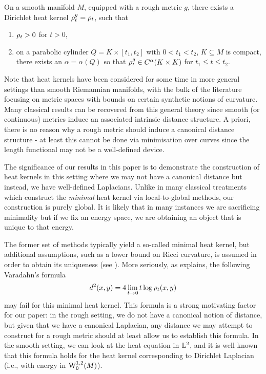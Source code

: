 \documentclass[a4paper, 12pt]{amsart}
\begin{document}
\begin{thm}
On a smooth manifold \(M\), equipped with a rough metric \(g\), there exists a 
Dirichlet heat kernel \(\hk_t^g = \hk_t\), such that
\begin{enumerate}
\item \(\hk_t > 0\) for \(t > 0\),
\item on a parabolic cylinder \(Q = K \times [t_1, t_2]\) with \(0 < t_1 < t_2\), \(K \subseteq M\) is compact, there exists an \(\alpha = \alpha(Q)\) so that \(\hk_t^g \in C^{\alpha}(K \times K)\) for \(t_1 \leq t \leq t_2\).
\end{enumerate}
\end{thm}


Note that heat kernels have been considered
for some time in more general settings than smooth Riemannian manifolds,
with the bulk of the literature focusing on metric spaces with bounds
on certain synthetic notions of curvature.
Many classical results can be recovered from this general 
theory since smooth (or continuous) metrics induce an associated intrinsic
distance structure. A priori, there is no reason
why a rough metric should induce a canonical distance structure - at least
this cannot be done via minimisation over curves since the
length functional may not be a well-defined device. 

The significance of our results in this paper is to demonstrate
the construction of heat kernels in this setting where we may 
not have a canonical distance but instead, we have well-defined Laplacians. 
Unlike in many classical treatments which construct the \emph{minimal} 
heat kernel via local-to-global methods, our construction is purely global.
It is likely that in many instances we are sacrificing minimality but if we fix
an energy space, we are obtaining an object that is unique to that energy.

The former set of methods typically yield a so-called minimal heat kernel,
but additional assumptions, such as a lower bound on Ricci curvature,
is assumed in order to obtain its uniqueness (see \cite{Chavel}).
More seriously, as \cite{Someone?} explains, the following Varadahn's formula
$$ d^2(x,y) = 4 \lim_{t \to 0} t \log \hk_t(x,y)$$
may fail for this minimal heat kernel. 
This formula is a strong motivating factor for our paper: 
in the rough setting, we do not have a canonical notion of
distance, but given that we have a canonical Laplacian, 
any distance we may attempt to construct for a rough 
metric should at least allow us to establish this formula.
In the smooth setting, we can look at the heat equation
in $\Lp{2}$, and it is well known that
this formula holds for the heat kernel corresponding to Dirichlet Laplacian (i.e., 
with energy in $\SobH[0]{1}(M)$). 
\end{document}
